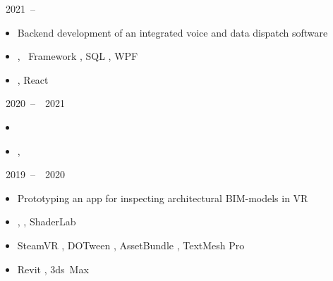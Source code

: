 
\cvevent{\net~\dev}{\elcomplus}
{\jan~2021~--~\present}{\tomsk}
\begin{itemize}
  \item {}
  {Backend development of an integrated voice and data dispatch software
  \underline{\smartptt}}
  \item \cs%
  , \net~Framework%
  , SQL%
  , WPF%
  \item \ts%
  , React%
\end{itemize}

\divider

{\sept~2020~--~\jan~2021}{\tomsk}
\begin{itemize}
  \item {}
  \item \cs%
  , \uni%
\end{itemize}

\divider

\cvevent{\uni~\dev}
{}
{\oct~2019~--~\jule~2020}{\tomsk}
\begin{itemize}
  \item {}
  {Prototyping an app for inspecting architectural BIM-models in VR}
  \item \cs%
  , \uni%
  , ShaderLab%
  \ifgamedev\item SteamVR%
  , DOTween%
  , AssetBundle%
  , TextMesh Pro\fi%
  \item Revit%
  , 3ds~Max%
\end{itemize}
